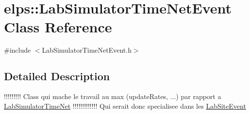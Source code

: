 \hypertarget{classelps_1_1_lab_simulator_time_net_event}{\section{elps\-:\-:Lab\-Simulator\-Time\-Net\-Event Class Reference}
\label{classelps_1_1_lab_simulator_time_net_event}
}


{\ttfamily \#include $<$Lab\-Simulator\-Time\-Net\-Event.\-h$>$}



\subsection{Detailed Description}
!!!!!!!!! Class qui mache le travail au max (update\-Rates, ...) par rapport a \hyperlink{classelps_1_1_lab_simulator_time_net}{Lab\-Simulator\-Time\-Net} !!!!!!!!!!!!! Qui serait donc specialisee dans les \hyperlink{classelps_1_1_lab_site_event}{Lab\-Site\-Event} 